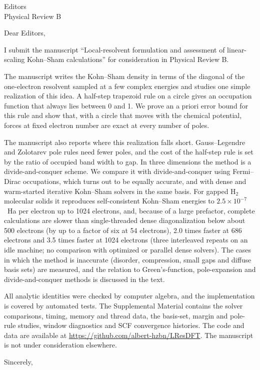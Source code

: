 \documentclass[11pt]{letter}
\begin{document}
\begin{letter}{Editors\\ Physical Review B}
\opening{Dear Editors,}

I submit the manuscript ``Local-resolvent formulation and assessment of linear-scaling Kohn--Sham calculations'' for
consideration in Physical Review B.

The manuscript writes the Kohn--Sham density in terms of the diagonal of the one-electron resolvent sampled at a few
complex energies and studies one simple realization of this idea. A half-step trapezoid rule on a circle
gives an occupation function that always lies between 0 and 1. We prove an a priori error bound for this rule and show that, with a circle that moves with the chemical
potential, forces at fixed electron number are exact at every number of poles.

The manuscript also reports where this realization falls short. Gauss--Legendre and Zolotarev pole rules need fewer poles, and the cost of the half-step rule is set by the ratio of occupied band width
to gap. In three dimensions the method is a divide-and-conquer scheme. We compare it with divide-and-conquer using
Fermi--Dirac occupations, which turns out to be equally accurate, and with dense and warm-started iterative Kohn--Sham
solvers in the same basis. For gapped H$_2$ molecular solids it reproduces self-consistent Kohn--Sham energies to
$2.5\times10^{-7}$~Ha per electron up to 1024 electrons, and, because of a large prefactor, complete calculations are slower than single-threaded dense diagonalization below about 500 electrons (by up to a factor of six at 54 electrons), 2.0 times faster at 686 electrons and 3.5 times faster at 1024 electrons (three interleaved repeats on an idle machine; no comparison with optimized or parallel dense solvers). The cases in which the method is inaccurate (disorder, compression, small gaps and diffuse
basis sets) are measured, and the relation to Green's-function, pole-expansion and
divide-and-conquer methods is discussed in the text.

All analytic identities were checked by computer algebra, and the implementation is covered by automated tests. The
Supplemental Material contains the solver comparisons, timing, memory and thread data, the basis-set, margin and pole-rule
studies, window diagnostics and SCF convergence histories. The code and data are available at \url{https://github.com/albert-hzbn/LResDFT}. The
manuscript is not under consideration elsewhere.

\closing{Sincerely,}
\end{letter}
\end{document}
